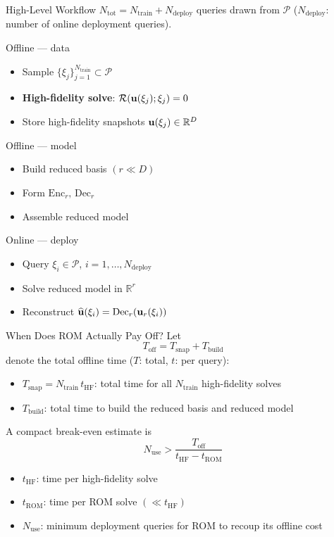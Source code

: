 \documentclass[10pt,aspectratio=169]{ntuabeamer}
\begin{document}
\begin{frame}{High-Level Workflow}
  \small
  \(N_{\mathrm{tot}} = N_{\mathrm{train}} + N_{\mathrm{deploy}}\) queries drawn from \(\mathcal{P}\)
  (\(N_{\mathrm{deploy}}\): number of online deployment queries).

  \threecols
  {
    \textcolor{ntuablue}{Offline — data}
    \begin{itemize}
      \item Sample \(\{\xi_j\}_{j=1}^{N_{\mathrm{train}}}\subset\mathcal{P}\)
      \item \textbf{High-fidelity solve}: \(\mathcal{R}(\mathbf{u}(\xi_j);\xi_j)=0\)
      \item Store high-fidelity snapshots \(\mathbf{u}(\xi_j)\in\mathbb{R}^D\)
    \end{itemize}
  }
  {
    \textcolor{ntuablue}{Offline — model}
    \begin{itemize}
      \item Build reduced basis \((r\ll D)\)
      \item Form \(\mathrm{Enc}_r,\,\mathrm{Dec}_r\)
      \item Assemble reduced model
    \end{itemize}
  }
  {
    \textcolor{ntuablue}{Online — deploy}
    \begin{itemize}
      \item Query \(\xi_i\in\mathcal{P}\), \(i=1,\dots,N_{\mathrm{deploy}}\)
      \item Solve reduced model in \(\mathbb{R}^r\)
      \item Reconstruct \(\widehat{\mathbf{u}}(\xi_i)=\mathrm{Dec}_r(\mathbf{u}_r(\xi_i))\)
    \end{itemize}
  }
\end{frame}

\begin{frame}{When Does ROM Actually Pay Off?}
  \small
  Let
  \[
    T_{\mathrm{off}} = T_{\mathrm{snap}} + T_{\mathrm{build}}
  \]
  denote the \textcolor{ntuablue}{total offline time} (\(T\): total, \(t\): per query):
  \begin{itemize}
    \item \(T_{\mathrm{snap}} = N_{\mathrm{train}}\,t_{\mathrm{HF}}\): total time for all \(N_{\mathrm{train}}\) high-fidelity solves
    \item \(T_{\mathrm{build}}\): total time to build the reduced basis and reduced model
  \end{itemize}

  \vspace{0.3em}
  A compact break-even estimate is
  \[
    N_{\mathrm{use}}
    >
    \frac{T_{\mathrm{off}}}
         {t_{\mathrm{HF}} - t_{\mathrm{ROM}}}
  \]

  \begin{itemize}
    \item \(t_{\mathrm{HF}}\): time per high-fidelity solve
    \item \(t_{\mathrm{ROM}}\): time per ROM solve \((\ll t_{\mathrm{HF}})\)
    \item \(N_{\mathrm{use}}\): minimum deployment queries for ROM to recoup its offline cost
  \end{itemize}
\end{frame}
\end{document}
